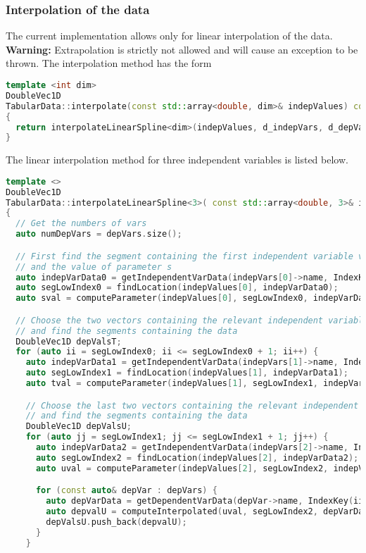 \subsubsection{Interpolation of the data}
The current implementation allows only for linear interpolation of the data. 
{\Red \textbf{Warning:} Extrapolation is strictly not allowed and will cause an exception to be thrown.}
The interpolation method has the form
\begin{lstlisting}[language=Cpp]
template <int dim>
DoubleVec1D
TabularData::interpolate(const std::array<double, dim>& indepValues) const
{
  return interpolateLinearSpline<dim>(indepValues, d_indepVars, d_depVars);
}
\end{lstlisting}
The linear interpolation method for three independent variables is listed below.
\begin{lstlisting}[language=Cpp]
template <>
DoubleVec1D
TabularData::interpolateLinearSpline<3>( const std::array<double, 3>& indepValues, const IndepVarPArray& indepVars, const DepVarPArray& depVars) const
{
  // Get the numbers of vars
  auto numDepVars = depVars.size();

  // First find the segment containing the first independent variable value
  // and the value of parameter s
  auto indepVarData0 = getIndependentVarData(indepVars[0]->name, IndexKey(0, 0, 0, 0));
  auto segLowIndex0 = findLocation(indepValues[0], indepVarData0);
  auto sval = computeParameter(indepValues[0], segLowIndex0, indepVarData0);

  // Choose the two vectors containing the relevant independent variable data
  // and find the segments containing the data
  DoubleVec1D depValsT;
  for (auto ii = segLowIndex0; ii <= segLowIndex0 + 1; ii++) {
    auto indepVarData1 = getIndependentVarData(indepVars[1]->name, IndexKey(ii, 0, 0, 0));
    auto segLowIndex1 = findLocation(indepValues[1], indepVarData1);
    auto tval = computeParameter(indepValues[1], segLowIndex1, indepVarData1);

    // Choose the last two vectors containing the relevant independent variable data
    // and find the segments containing the data
    DoubleVec1D depValsU;
    for (auto jj = segLowIndex1; jj <= segLowIndex1 + 1; jj++) {
      auto indepVarData2 = getIndependentVarData(indepVars[2]->name, IndexKey(ii, jj, 0, 0));
      auto segLowIndex2 = findLocation(indepValues[2], indepVarData2);
      auto uval = computeParameter(indepValues[2], segLowIndex2, indepVarData2);

      for (const auto& depVar : depVars) {
        auto depVarData = getDependentVarData(depVar->name, IndexKey(ii, jj, 0, 0));
        auto depvalU = computeInterpolated(uval, segLowIndex2, depVarData);
        depValsU.push_back(depvalU);
      }
    }


\end{lstlisting}
